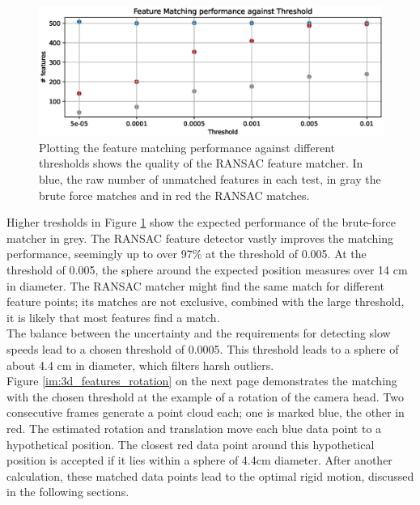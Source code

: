 \begin{figure}[H]
    \centering
    \includegraphics[width=1.0\textwidth]{images/noise_against_threshold.eps}
    \caption{Plotting the feature matching performance against different thresholds shows the quality of the RANSAC feature matcher. In blue, the raw number of unmatched features in each test, in gray the brute force matches and in red the RANSAC matches.}
    \label{im:noise_against_thresh}
\end{figure}
Higher tresholds in Figure \ref{im:noise_against_thresh} show the expected performance of the brute-force matcher in grey. The RANSAC feature detector vastly improves the matching performance, seemingly up to over 97\% at the threshold of 0.005. At the threshold of 0.005, the sphere around the expected position measures over 14 cm in diameter. The RANSAC matcher might find the same match for different feature points; its matches are not exclusive, combined with the large threshold, it is likely that most features find a match.\\
The balance between the uncertainty and the requirements for detecting slow speeds lead to a chosen threshold of 0.0005. This threshold leads to a sphere of about 4.4 cm in diameter, which filters harsh outliers.\\ 
Figure \ref{im:3d_features_rotation} on the next page demonstrates the matching with the chosen threshold at the example of a rotation of the camera head. Two consecutive frames generate a point cloud each; one is marked blue, the other in red. The estimated rotation and translation move each blue data point to a hypothetical position. The closest red data point around this hypothetical position is accepted if it lies within a sphere of 4.4cm diameter. 
After another calculation, these matched data points lead to the optimal rigid motion, discussed in the following sections.\\

